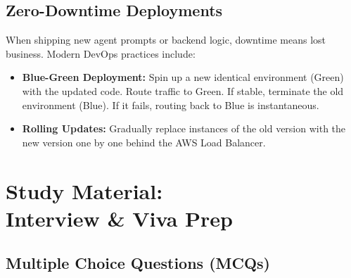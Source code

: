 \documentclass[12pt,a4paper,oneside]{book}
\begin{document}
\section{Zero-Downtime Deployments}
When shipping new agent prompts or backend logic, downtime means lost business. Modern DevOps practices include:
\begin{itemize}
    \item \textbf{Blue-Green Deployment:} Spin up a new identical environment (Green) with the updated code. Route traffic to Green. If stable, terminate the old environment (Blue). If it fails, routing back to Blue is instantaneous.
    \item \textbf{Rolling Updates:} Gradually replace instances of the old version with the new version one by one behind the AWS Load Balancer.
\end{itemize}

\chapter[Study Material: Interview \& Viva Prep]{Study Material:\\Interview \& Viva Prep}
\section{Multiple Choice Questions (MCQs)}
\end{document}
